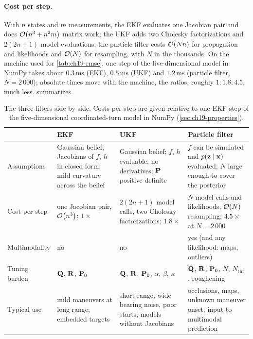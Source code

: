 \paragraph{Cost per step.}
With $n$ states and $m$ measurements, the EKF evaluates one Jacobian pair and
does $\mathcal{O}\!\left(n^3 + n^2 m\right)$ matrix work; the UKF adds two Cholesky
factorizations and $2(2n+1)$ model evaluations; the particle filter costs
$\mathcal{O}\!\left(Nn\right)$ for propagation and likelihoods and $\mathcal{O}\!\left(N\right)$ for resampling,
with $N$ in the thousands. On the machine used for \cref{tab:ch19-rmse},
one step of the five-dimensional model in NumPy takes about
$0.3\,\mathrm{ms}$ (EKF), $0.5\,\mathrm{ms}$ (UKF) and
$1.2\,\mathrm{ms}$ (particle filter, $N = 2\,000$); absolute times move
with the machine, the ratios, roughly $1 : 1.8 : 4.5$, much less.
 summarizes.

\begin{table}[tb]
  \centering\small
  \caption{The three filters side by side. Costs per step are given
  relative to one EKF step of the five-dimensional coordinated-turn model
  in NumPy (\cref{sec:ch19-properties}).}
  \label{tab:ch19-comparison}
  \begin{tabular}{@{}p{2.2cm}p{3.5cm}p{3.5cm}p{3.9cm}@{}}
  \toprule
  & EKF & UKF & Particle filter\\
  \midrule
  Assumptions & Gaussian belief; Jacobians of $f$, $h$ in closed form; mild curvature across the belief & Gaussian belief; $f$, $h$ evaluable, no derivatives; $\mathbf{P}$ positive definite & $f$ can be simulated and $p(\mathbf{z} \mid \mathbf{x})$ evaluated; $N$ large enough to cover the posterior\\
  Cost per step & one Jacobian pair, $\mathcal{O}\!\left(n^3\right)$; $1\times$ & $2(2n+1)$ model calls, two Cholesky factorizations; $1.8\times$ & $N$ model calls and likelihoods, $\mathcal{O}\!\left(N\right)$ resampling; $4.5\times$ at $N = 2\,000$\\
  Multimodality & no & no & yes (and any likelihood: maps, outliers)\\
  Tuning burden & $\mathbf{Q}$, $\mathbf{R}$, $\mathbf{P}_0$ & $\mathbf{Q}$, $\mathbf{R}$, $\mathbf{P}_0$, $\alpha$, $\beta$, $\kappa$ & $\mathbf{Q}$, $\mathbf{R}$, $\mathbf{P}_0$, $N$, $N_{\mathrm{thr}}$, roughening\\
  Typical use & mild maneuvers at long range; embedded targets & short range, wide bearing noise, poor starts; models without Jacobians & occlusions, maps, unknown maneuver onset; input to multimodal prediction\\
  \bottomrule
  \end{tabular}
\end{table}

